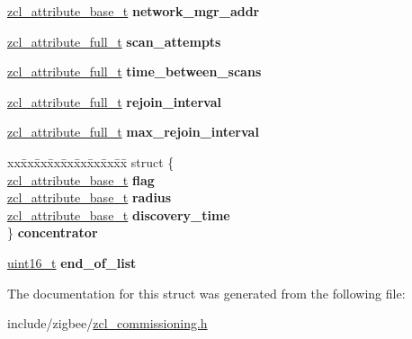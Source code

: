 \begin{DoxyCompactItemize}
\item 
\hyperlink{structzcl__attribute__base__t}{zcl\+\_\+attribute\+\_\+base\+\_\+t} {\bfseries network\+\_\+mgr\+\_\+addr}
\item 
\hyperlink{structzcl__attribute__full__t}{zcl\+\_\+attribute\+\_\+full\+\_\+t} {\bfseries scan\+\_\+attempts}
\item 
\hyperlink{structzcl__attribute__full__t}{zcl\+\_\+attribute\+\_\+full\+\_\+t} {\bfseries time\+\_\+between\+\_\+scans}
\item 
\hyperlink{structzcl__attribute__full__t}{zcl\+\_\+attribute\+\_\+full\+\_\+t} {\bfseries rejoin\+\_\+interval}
\item 
\hyperlink{structzcl__attribute__full__t}{zcl\+\_\+attribute\+\_\+full\+\_\+t} {\bfseries max\+\_\+rejoin\+\_\+interval}
\item 
\begin{tabbing}
xx\=xx\=xx\=xx\=xx\=xx\=xx\=xx\=xx\=\kill
struct \{\\
\>\hyperlink{structzcl__attribute__base__t}{zcl\_attribute\_base\_t} {\bfseries flag}\\
\>\hyperlink{structzcl__attribute__base__t}{zcl\_attribute\_base\_t} {\bfseries radius}\\
\>\hyperlink{structzcl__attribute__base__t}{zcl\_attribute\_base\_t} {\bfseries discovery\_time}\\
\} {\bfseries concentrator}\\

\end{tabbing}\item 
\hyperlink{group__hal__dos_ga5a8b2dc9e45a9ee81a94ef304fb62505}{uint16\+\_\+t} {\bfseries end\+\_\+of\+\_\+list}
\end{DoxyCompactItemize}


The documentation for this struct was generated from the following file\+:\begin{DoxyCompactItemize}
\item 
include/zigbee/\hyperlink{zcl__commissioning_8h}{zcl\+\_\+commissioning.\+h}\end{DoxyCompactItemize}
